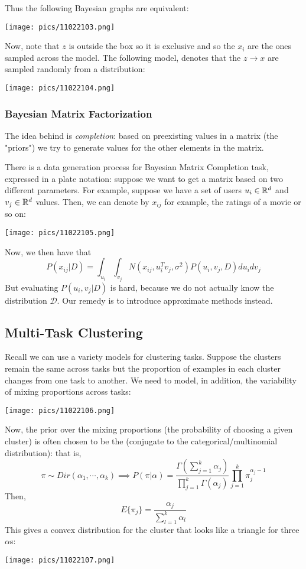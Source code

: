 \documentclass[11pt]{scrartcl}
\begin{document}
Thus the following Bayesian graphs are equivalent: 
\begin{center}
    \texttt{[image: pics/11022103.png]}
\end{center}

Now, note that $z$ is outside the box so it is exclusive and so the $x_i$ are the ones sampled across the model. The following model, denotes that the $z \to x$ are sampled randomly from a distribution:
\begin{center}
    \texttt{[image: pics/11022104.png]}
\end{center}

\subsubsection{Bayesian Matrix Factorization}
The idea behind  is \textit{completion}: based on preexisting values in a matrix (the "priors") we try to generate values for the other elements in the matrix.

There is a data generation process for Bayesian Matrix Completion task, expressed in a plate notation: suppose we want to get a matrix based on two different parameters. For example, suppose we have a set of users $u_i \in \mathbb{R}^{d}$ and $v_j \in \mathbb{R}^d$ values. Then, we can denote by $x_{ij}$ for example, the ratings of a movie or so on: 
\begin{center}
    \texttt{[image: pics/11022105.png]}
\end{center}
Now, we then have that $$P(x_{ij}|D)=\int_{u_i}\int_{v_j}N(x_{ij},u_i^{T}v_j,\sigma^2)P(u_i,v_j,D)du_idv_j$$ But evaluating $P(u_i,v_j|D)$ is hard, because we do not actually know the distribution $\mathcal{D}$. Our remedy is to introduce approximate methods instead.

\subsection{Multi-Task Clustering}
Recall we can use a variety models for clustering tasks. Suppose the clusters remain the same across tasks but the proportion of examples in each cluster changes from one task to another. We need to model, in addition, the variability of mixing proportions across tasks:
\begin{center}
    \texttt{[image: pics/11022106.png]}
\end{center}
Now, the prior over the mixing proportions (the probability of choosing a given cluster) is often chosen to be the  (conjugate to the categorical/multinomial distribution): that is, $$\pi \sim Dir(\alpha_1,\cdots,\alpha_k) \implies P(\pi|\alpha)=\frac{\Gamma\left(\sum_{j=1}^{k}\alpha_j\right)}{\prod_{j=1}^{k}\Gamma(\alpha_j)}\prod_{j=1}^{k}\pi_j^{\alpha_j-1}$$
Then, $$E\{\pi_j\}=\frac{\alpha_j}{\sum_{l=1}^{k}\alpha_l}$$
This gives a convex distribution for the cluster that looks like a triangle for three $\alpha$s: 
\begin{center}
    \texttt{[image: pics/11022107.png]}
\end{center}
\end{document}
